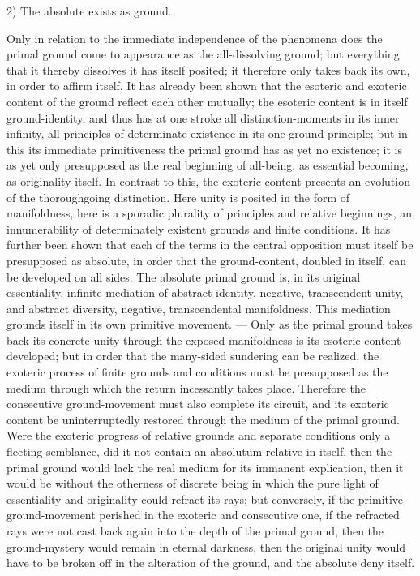 \documentclass[12pt,a4paper,openany]{book}
\newcommand{\opage}[1]{\marginnote{\footnotesize\textit{[#1]}}}
\begin{document}
2) The absolute exists as ground.

Only in relation to the immediate independence of the phenomena
does the primal ground come to appearance as the all-dissolving
ground; but everything that it thereby dissolves it has
itself posited; it therefore only takes back its own,
in order to affirm itself. It has already been
shown that the esoteric and exoteric content of the ground reflect
each other mutually; the esoteric content is in itself
ground-identity, and thus has at one stroke all distinction-moments
in its inner infinity, all principles of determinate existence
in its one ground-principle; but in this its
immediate primitiveness the primal ground has as yet no
\setcounter{footnote}{0}%
\opage{162}existence; it is as yet only presupposed as the real beginning
of all-being, as essential becoming, as originality
itself. In contrast to this, the exoteric content presents
an evolution of the thoroughgoing
distinction. Here unity is posited in the form of manifoldness,
here is a sporadic plurality of principles and relative
beginnings, an innumerability of determinately existent grounds
and finite conditions. It has further been shown
that each of the terms in the central opposition must itself
be presupposed as absolute, in order that the ground-content, doubled
in itself, can be developed on all sides. The absolute
primal ground is, in its original essentiality, infinite mediation
of abstract identity, negative, transcendent unity,
and abstract diversity, negative, transcendental
manifoldness. This mediation grounds itself in its
own primitive movement. --- Only as the primal ground takes back
its concrete unity through the exposed
manifoldness is its esoteric content developed;
but in order that the many-sided sundering can be realized,
the exoteric process of finite grounds and conditions must be
presupposed as the medium through which the return
incessantly takes place. Therefore the consecutive
ground-movement must also complete its circuit,
and its exoteric content be uninterruptedly restored through
the medium of the primal ground. Were the exoteric
progress of relative grounds and separate conditions only
a fleeting semblance, did it not contain an absolutum relative
in itself, then the primal ground would lack the real medium
for its immanent explication, then it would be without
the otherness of discrete being in which the pure light of essentiality and
originality could refract its rays;
but conversely, if the primitive ground-movement perished
in the exoteric and consecutive one, if the refracted
rays were not cast back again into the depth of the primal ground,
\setcounter{footnote}{0}%
\opage{163}then the ground-mystery would remain in eternal darkness, then
the original unity would have to be broken off in the alteration
of the ground, and the absolute deny itself.
\end{document}

